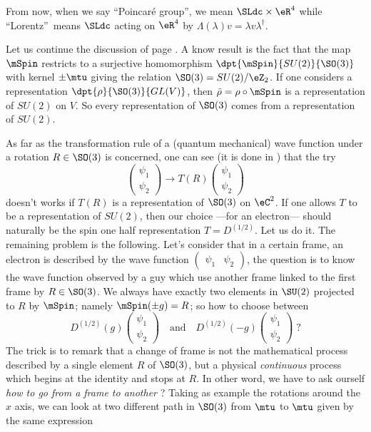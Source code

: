 From now, when we say ``Poincaré group'', we mean $\SLdc\times\eR^4$ while  ``Lorentz''\ means $\SLdc$ acting on $\eR^4$ by $\Lambda(\lambda)v=\lambda v\lambda^{\dag}$.

Let us continue the discussion of page \pageref{pg:reprez_SOt}. A know result is the fact that the map $\mSpin$ restricts to a surjective homomorphism $\dpt{\mSpin}{SU(2)}{\SO(3)}$ with kernel $\pm\mtu$ giving the relation $\SO(3)=SU(2)/\eZ_2$. If one considers a representation $\dpt{\rho}{\SO(3)}{GL(V)}$, then $\tilde\rho=\rho\circ\mSpin$ is a representation of $SU(2)$ on $V$. So every representation of $\SO(3)$ comes from a representation of $SU(2)$.

As far as the transformation rule of a (quantum mechanical) wave function under a rotation $R\in \SO(3)$ is concerned, one can see (it is done in \cite{Naber}) that the try
\[
   \begin{pmatrix}
     \psi_1\\
     \psi_2
   \end{pmatrix}\to
T(R)
\begin{pmatrix}
     \psi_1\\
     \psi_2
   \end{pmatrix}
\]
doesn't works if $T(R)$ is a representation of $\SO(3)$ on $\eC^2$. If one allows $T$ to be a representation of $SU(2)$, then our choice ---for an electron--- should naturally be the spin one half representation $T=D^{(1/2)}$. Let us do it. The remaining problem is the following. Let's consider that in a certain frame, an electron is described by the wave function $\begin{pmatrix} \psi_1&\psi_2\end{pmatrix}$, the question is to know the wave function observed by a guy which use another frame linked to the first frame by $R\in \SO(3)$. We always have exactly two elements in $\SU(2)$ projected to $R$ by $\mSpin$; namely $\mSpin(\pm g)=R$; so how to choose between
\[
   D^{(1/2)}(g)
\begin{pmatrix}
     \psi_1\\
     \psi_2
   \end{pmatrix}
\quad\text{and}\quad
   D^{(1/2)}(-g)
\begin{pmatrix}
     \psi_1\\
     \psi_2
   \end{pmatrix}\; ?
\]
The trick is to remark that a change of frame is not the mathematical process described by a single element $R$ of $\SO(3)$, but a physical \emph{continuous} process which begins at the identity and stops at $R$. In other word, we have to ask ourself \emph{how to go from a frame to another} ? Taking as example the rotations around the $x$ axis, we can look at two different path in $\SO(3)$ from $\mtu$ to $\mtu$ given by the same expression
